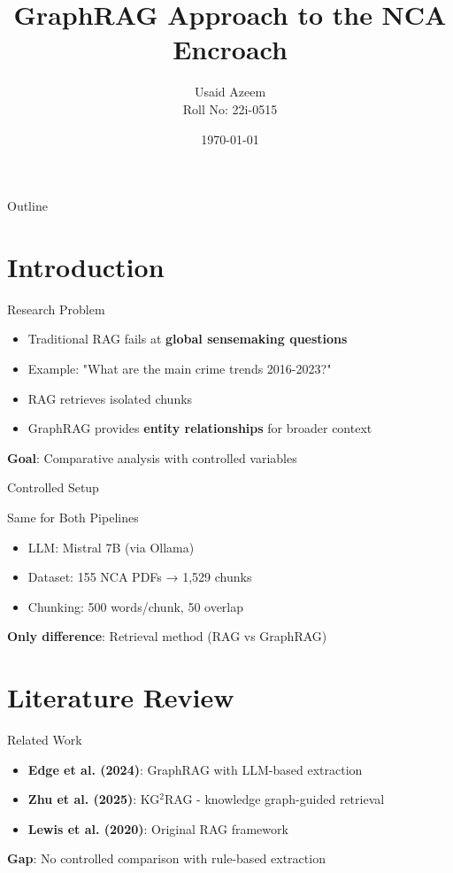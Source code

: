 \documentclass{beamer}
\title{GraphRAG Approach to the NCA Encroach}
\author{Usaid Azeem \\ Roll No: 22i-0515}
\institute{Department of AI \\ FAST-NUCES}
\date{\today}
\begin{document}
\begin{frame}
\titlepage
\end{frame}

\begin{frame}{Outline}
\tableofcontents
\end{frame}

\section{Introduction}
\begin{frame}{Research Problem}
\begin{itemize}
\item Traditional RAG fails at \textbf{global sensemaking questions}
\item Example: "What are the main crime trends 2016-2023?"
\item RAG retrieves isolated chunks
\item GraphRAG provides \textbf{entity relationships} for broader context
\end{itemize}
\textbf{Goal}: Comparative analysis with controlled variables
\end{frame}

\begin{frame}{Controlled Setup}
\begin{block}{Same for Both Pipelines}
\begin{itemize}
\item LLM: Mistral 7B (via Ollama)
\item Dataset: 155 NCA PDFs → 1,529 chunks
\item Chunking: 500 words/chunk, 50 overlap
\end{itemize}
\end{block}
\textbf{Only difference}: Retrieval method (RAG vs GraphRAG)
\end{frame}

\section{Literature Review}
\begin{frame}{Related Work}
\begin{itemize}
\item \textbf{Edge et al. (2024)}: GraphRAG with LLM-based extraction
\item \textbf{Zhu et al. (2025)}: KG$^2$RAG - knowledge graph-guided retrieval
\item \textbf{Lewis et al. (2020)}: Original RAG framework
\end{itemize}
\vspace{0.5cm}
\textbf{Gap}: No controlled comparison with rule-based extraction
\end{frame}
\end{document}
